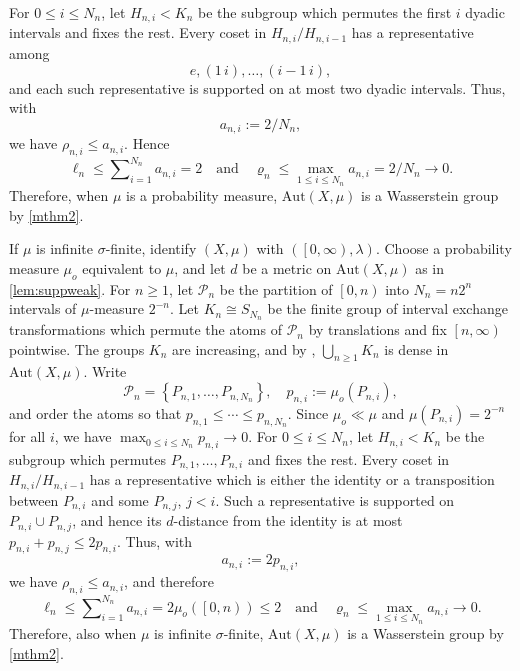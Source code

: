 \documentclass{amsart}
\numberwithin{equation}{subsection}
\theoremstyle{plain}
\theoremstyle{definition}
\theoremstyle{plain}
\begin{document}
For \(0\leq i\leq N_{n}\), let \(H_{n,i}<K_{n}\) be the subgroup which permutes the first \(i\) dyadic intervals and fixes the rest. Every coset in \(H_{n,i}/H_{n,i-1}\) has a representative among
\[e,\left(1\,i\right),\dotsc,\left(i-1\,i\right),\]
and each such representative is supported on at most two dyadic intervals. Thus, with
\[a_{n,i}:=2/N_{n},\]
we have \(\rho_{n,i}\leq a_{n,i}\). Hence
\[\ell_{n}\leq\sum\nolimits_{i=1}^{N_{n}}a_{n,i}=2\quad\text{and}\quad\varrho_{n}\leq\max_{1\leq i\leq N_{n}}a_{n,i}=2/N_{n}\to0.\]
Therefore, when \(\mu\) is a probability measure, \(\mathrm{Aut}\left(X,\mu\right)\) is a Wasserstein group by \cref{mthm2}.

\smallskip

If \(\mu\) is infinite \(\sigma\)-finite, identify \(\left(X,\mu\right)\) with \(\left(\left[0,\infty\right),\lambda\right)\). Choose a probability measure \(\mu_{o}\) equivalent to \(\mu\), and let \(d\) be a metric on \(\mathrm{Aut}\left(X,\mu\right)\) as in \cref{lem:suppweak}. For \(n\geq1\), let \(\mathcal{P}_{n}\) be the partition of \(\left[0,n\right)\) into \(N_{n}=n2^{n}\) intervals of \(\mu\)-measure \(2^{-n}\). Let \(K_{n}\cong S_{N_{n}}\) be the finite group of interval exchange transformations which permute the atoms of \(\mathcal{P}_{n}\) by translations and fix \(\left[n,\infty\right)\) pointwise. The groups \(K_{n}\) are increasing, and by \cite[Thm.~4.1]{giordano2007some}, \(\bigcup_{n\geq1}K_{n}\) is dense in \(\mathrm{Aut}\left(X,\mu\right)\). Write
\[\mathcal{P}_{n}=\left\{P_{n,1},\dotsc,P_{n,N_{n}}\right\},\quad p_{n,i}:=\mu_{o}\left(P_{n,i}\right),\]
and order the atoms so that \(p_{n,1}\leq\dotsm\leq p_{n,N_{n}}\). Since \(\mu_{o}\ll\mu\) and \(\mu\left(P_{n,i}\right)=2^{-n}\) for all \(i\), we have \(\max_{0\leq i\leq N_{n}}p_{n,i}\to0\). For \(0\leq i\leq N_{n}\), let \(H_{n,i}<K_{n}\) be the subgroup which permutes \(P_{n,1},\dotsc,P_{n,i}\) and fixes the rest. Every coset in \(H_{n,i}/H_{n,i-1}\) has a representative which is either the identity or a transposition between \(P_{n,i}\) and some \(P_{n,j}\), \(j<i\). Such a representative is supported on \(P_{n,i}\cup P_{n,j}\), and hence its \(d\)-distance from the identity is at most
\(p_{n,i}+p_{n,j}\leq2p_{n,i}\). Thus, with
\[a_{n,i}:=2p_{n,i},\]
we have \(\rho_{n,i}\leq a_{n,i}\), and therefore
\[\ell_{n}\leq\sum\nolimits_{i=1}^{N_{n}}a_{n,i}=2\mu_{o}\left(\left[0,n\right)\right)\leq2\quad\text{and}\quad\varrho_{n}\leq\max_{1\leq i\leq N_{n}}a_{n,i}\to0.\]
Therefore, also when \(\mu\) is infinite \(\sigma\)-finite, \(\mathrm{Aut}\left(X,\mu\right)\) is a Wasserstein group by \cref{mthm2}.
\end{document}
